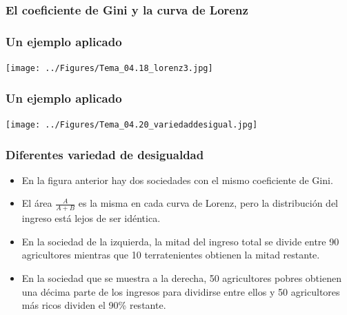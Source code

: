 \documentclass{beamer}
\begin{document}
\begin{frame} 
\frametitle{El coeficiente de Gini y la curva de Lorenz}
\begin{figure} [H]
\centering
{}
\end{figure} 
\end{frame}

\begin{frame} 
\frametitle{Un ejemplo aplicado}
    \begin{center}    
    \texttt{[image: ../Figures/Tema\_04.18\_lorenz3.jpg]}
    \end{center}
\end{frame}

\begin{frame} 
\frametitle{Un ejemplo aplicado}
    \begin{center}    
    \texttt{[image: ../Figures/Tema\_04.20\_variedaddesigual.jpg]}
    \end{center}
\end{frame}

\begin{frame} 
\frametitle{Diferentes variedad de desigualdad}
\begin{itemize}
\item En la figura anterior hay dos sociedades con el mismo coeficiente de Gini.
\item El área $\frac{A}{A + B}$ es la misma en cada curva de Lorenz, pero la distribución del ingreso está lejos de ser idéntica.
\item En la sociedad de la izquierda, la mitad del ingreso total se divide entre 90 agricultores mientras que 10 terratenientes obtienen la mitad restante. 
\item En la sociedad que se muestra a la derecha, 50 agricultores pobres obtienen una décima parte de los ingresos para dividirse entre ellos y 50 agricultores más ricos dividen el 90\% restante.
\end{itemize}
\end{frame}
\end{document}
